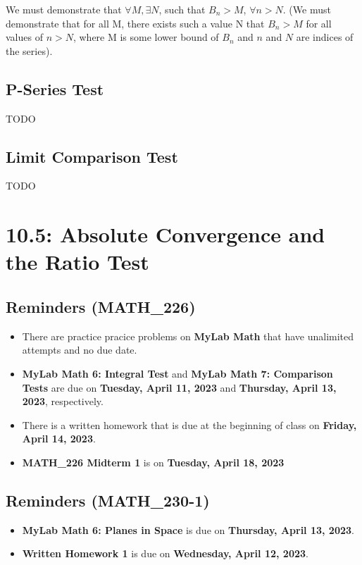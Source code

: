 \documentclass{report}
\begin{document}
\begin{sloppypar}
We must demonstrate that $\forall M, \exists N $, such that
$ B_{n} > M $, $\forall n > N $. (We must demonstrate
that for all M, there exists such a value N that
$ B_{n} > M $ for all values of $ n > N $, where
M is some lower bound of $ B_{n} $ and $ n$ and $ N$ are indices
of the series).
\section{P-Series Test}
TODO
\section{Limit Comparison Test}
TODO









\chapter{10.5: Absolute Convergence and the Ratio Test}
\section{Reminders (MATH\_226)}
\begin{itemize}
  \item There are practice pracice problems on \textbf{MyLab Math} that have unalimited attempts and no due date.
  \item \textbf{MyLab Math 6: Integral Test} and
        \textbf{MyLab Math 7: Comparison Tests} are due on
        \textbf{Tuesday, April 11, 2023} and \textbf{Thursday,
        April 13, 2023}, respectively.
  \item There is a written homework that is due at the beginning of class on \textbf{Friday, April 14, 2023}.
        \item \textbf{MATH\_226 Midterm 1} is on \textbf{Tuesday, April 18, 2023}
\end{itemize}

\section{Reminders (MATH\_230-1)}
\begin{itemize}
  \item \textbf{MyLab Math 6: Planes in Space} is due on
        \textbf{Thursday, April 13, 2023}.
  \item \textbf{Written Homework 1} is due on
        \textbf{Wednesday, April 12, 2023}.
\end{itemize}




\end{sloppypar}
\end{document}
